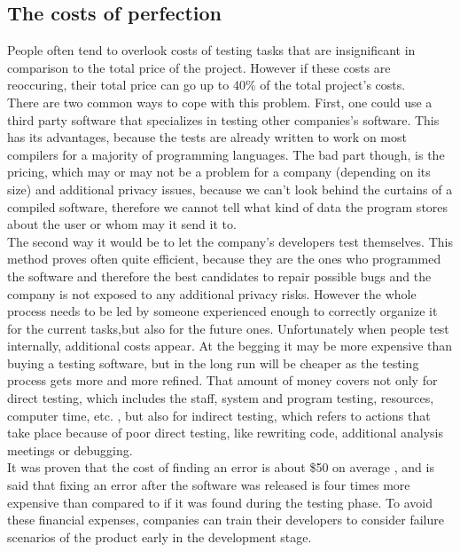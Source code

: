 \subsection{The costs of perfection}
People often tend to overlook costs of testing tasks that are insignificant in comparison to the total price of the project. However if these costs are reoccuring, their total price can go up to 40\% of the total project's costs\cite{8822082}.\\
There are two common ways to cope with this problem. First, one could use a third party software that specializes in testing other companies's software. This has its advantages, because the tests are already written to work on most compilers for a majority of programming languages. The bad part though, is the pricing, which may or may not be a problem for a company (depending on its size) and additional privacy issues, because we can't \dq look behind the curtains\dq{} of a compiled software, therefore we cannot tell what kind of data the program stores about the user or whom may it send it to.\\
The second way it would be to let the company's developers test themselves. This method proves often quite efficient, because they are the ones who programmed the software and therefore the best candidates to repair possible bugs and the company is not exposed to any additional privacy risks. However the whole process needs to be led by someone experienced enough to correctly organize it for the current tasks,but also for the future ones. Unfortunately when people test internally, additional costs appear. At the begging it may be more expensive than buying a testing software, but in the long run will be cheaper as the testing process gets more and more refined. That amount of money covers not only for direct testing, which includes the staff, system and program testing, resources, computer time, etc. , but also for indirect testing, which refers to actions that take place because of poor direct testing, like rewriting code, additional analysis meetings or debugging.\\
It was proven that the cost of finding an error is about \$50 on average \cite{10.1145/1010773.1010774}, and is said that fixing an error after the software was released is four times more expensive than compared to if it was found during the testing phase.\cite{10.1007/978-981-10-8848-3_46} To avoid these financial expenses, companies can train their developers to consider failure scenarios of the product early in the development stage.

